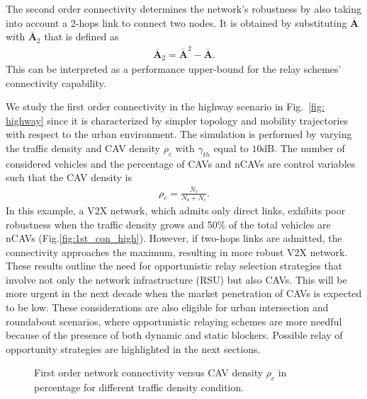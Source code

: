 \documentclass[journal]{IEEEtran}
\begin{document}
The second order connectivity determines the network's robustness by also taking into account a 2-hops link to connect two nodes. %
It is obtained by substituting $\mathbf{\bar{A}}$ with $ \mathbf{\bar{A}}_2$ that is defined as
%
\begin{align}\label{eq:2ordAvailMatrix}
    \mathbf{\bar{A}}_2 =  \mathbf{\bar{A}}^2- \mathbf{\bar{A}}.
\end{align}
%
This can be interpreted as a performance upper-bound for the relay schemes' connectivity capability. 

We study the first order connectivity in the highway scenario in Fig.~\ref{fig: highway} 
since it is characterized by simpler topology and mobility trajectories with respect to the urban environment. 
The simulation is performed by varying the traffic density and CAV density $\rho_c$ with $\gamma_{th}$ equal to $10$dB. The number of considered vehicles and the percentage of CAVs and nCAVs are control variables such that the CAV density is
%
\begin{align}
    \rho_c = \frac{N_c}{N_b+N_c}.
\end{align}
%
In this example, a V2X network, which admits only direct links, exhibits poor robustness when the traffic density grows and 50\% of the total vehicles are nCAVs (Fig.\ref{fig:1st_con_high}). However, if two-hops links are admitted, the connectivity approaches the maximum, resulting in more robust V2X network. These results outline the need for opportunistic relay selection strategies that involve not only the network infrastructure (RSU) but also CAVs. This will be more urgent in the next decade when the market penetration of CAVs is expected to be low. These considerations are also eligible for urban intersection and roundabout scenarios, where opportunistic relaying schemes are more needful because of the presence of both dynamic and static blockers.
Possible relay of opportunity strategies are highlighted in the next sections.

\begin{figure} [t!]
    \centering
    
    \caption{First order network connectivity versus CAV density $\rho_c$ in percentage for different traffic density condition.}
    \label{fig:graph_con}
\end{figure}
\end{document}
